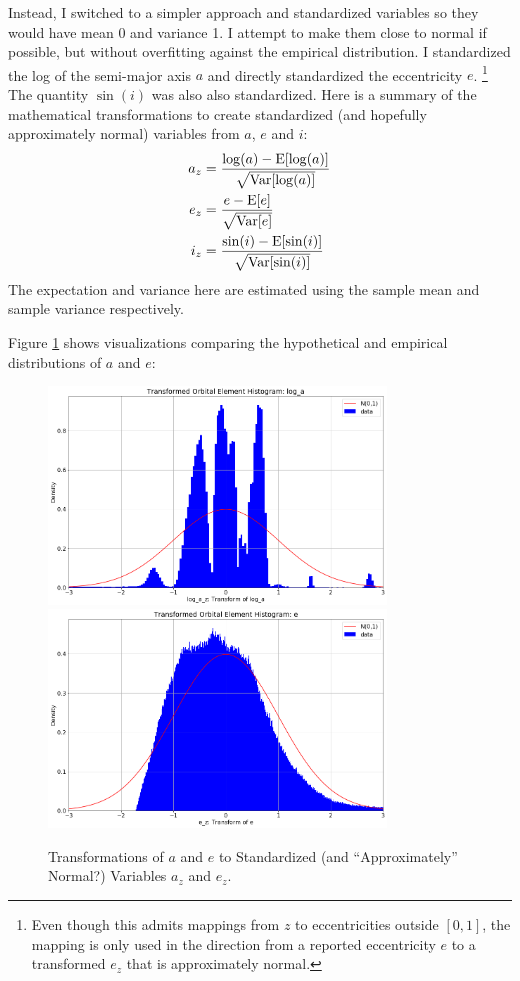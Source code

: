 Instead, I switched to a simpler approach and standardized variables so they would have mean 0 and variance 1.
I attempt to make them close to normal if possible, but without overfitting against the empirical distribution.
I standardized the log of the semi-major axis $a$ and directly standardized the eccentricity $e$.
\footnote{Even though this admits mappings from $z$ to eccentricities outside $[0,1]$, the mapping is only used in the direction
from a reported eccentricity $e$ to a transformed $e_z$ that is approximately normal.}
The quantity $\sin(i)$ was also also standardized.
Here is a summary of the mathematical transformations to create standardized 
(and hopefully approximately normal) variables from $a$, $e$ and $i$:
\begin{align*}
a_z &= \frac{\log(a) - \mathrm{E}[\log(a)]}{\sqrt{\mathrm{Var}[\log(a)]}} \\
e_z &= \frac{e - \mathrm{E}[e]}{\sqrt{\mathrm{Var}[e]}} \\
i_z &= \frac{\sin(i) - \mathrm{E}[\sin(i)]}{\sqrt{\mathrm{Var}[\sin(i)]}}
\end{align*}
The expectation and variance here are estimated using the sample mean and sample variance respectively.

Figure \ref{fig:ast_elt_standardize_a_e} shows visualizations comparing the hypothetical and empirical distributions of $a$ and $e$:
\begin{figure}[hbt!]
\begin{center}
\includegraphics[width=0.8\textwidth]{../figs/elts_cov/log_a_z.png}
\includegraphics[width=0.8\textwidth]{../figs/elts_cov/e_z.png}
\end{center}
\caption[Transformations of $a$ and $e$ to Standardized Variables $a_z$ and $e_z$]
{Transformations of $a$ and $e$ to Standardized (and ``Approximately'' Normal?) Variables $a_z$ and $e_z$.}
\label{fig:ast_elt_standardize_a_e}
\end{figure}
\clearpage

